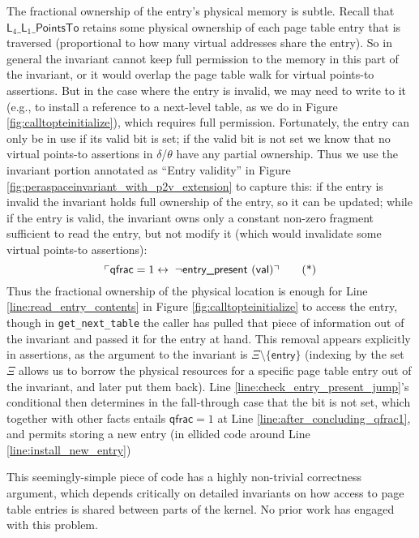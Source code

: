 The fractional ownership of the entry's physical memory is subtle. Recall that $\textsf{L}_{4}\_\textsf{L}_{1}\_\textsf{PointsTo}$ retains some physical
ownership of each page table entry that is traversed (proportional to how many virtual addresses share the entry).
So in general the invariant cannot keep full permission to the memory in this part of the invariant, or it would overlap the page table walk for virtual points-to
assertions. But in the case where the entry is invalid, we may need to write to it (e.g., to install a reference to a next-level table, as we do in Figure \ref{fig:calltopteinitialize}),
which requires full permission. Fortunately, the entry can only be in use if its valid bit is set; if the valid bit is not set we know
that no virtual points-to assertions in $\delta$/$\theta$ have any partial ownership.
Thus we use the invariant portion annotated as ``Entry validity'' in Figure \ref{fig:peraspaceinvariant_with_p2v_extension} to capture this:
if the entry is invalid the invariant holds full ownership of the entry, so it can be updated; while if the entry is valid,
the invariant owns only a constant non-zero fragment sufficient to read the entry, but not modify it (which would invalidate some virtual points-to assertions):
\begin{equation*}
 \ulcorner \textsf{qfrac} = 1 \leftrightarrow \; \lnot\textsf{entry\_present }(\textsf{val}) \urcorner \tag{*}
\end{equation*}
Thus the fractional ownership of the physical location is enough for Line \ref{line:read_entry_contents} in Figure \ref{fig:calltopteinitialize} to access the entry, though in \lstinline|get_next_table|
the caller has pulled that piece of information out of the invariant and passed it for the entry at hand.
This removal appears explicitly in assertions,
as the argument to the invariant is $\Xi\setminus\{\mathsf{entry}\}$ (indexing by the set $\Xi$ allows us to borrow the physical resources
for a specific page table entry out of the invariant, and later put them back).
Line \ref{line:check_entry_present_jump}'s conditional then determines in the fall-through case that the bit is not set, which 
together with other facts entails $\textsf{qfrac} = 1$ at Line \ref{line:after_concluding_qfrac1},
and permits storing a new entry (in ellided code around Line \ref{line:install_new_entry})

This seemingly-simple piece of code has a highly non-trivial correctness argument, which depends critically on detailed invariants on how access to page table
entries is shared between parts of the kernel. No prior work has engaged with this problem.

